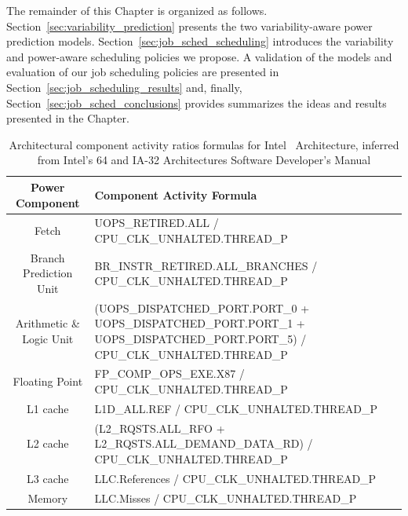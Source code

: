 The remainder of this Chapter is organized as follows.
Section~\ref{sec:variability_prediction} presents the two variability-aware power
prediction models.  Section~\ref{sec:job_sched_scheduling} introduces the variability and
power-aware scheduling policies we propose.  A validation of the models and evaluation of
our job scheduling policies are presented in Section~\ref{sec:job_scheduling_results}
and, finally, Section~\ref{sec:job_sched_conclusions} provides summarizes the
ideas and results presented in the Chapter.


\begin{table}
	\centering
	\caption{Architectural component activity ratios formulas for Intel \ARCH~Architecture,
inferred from Intel's 64 and IA-32 Architectures Software Developer's Manual
\cite{fquesnel:progguide:intel10}}
	\label{tab:comp_formulas}
	\begin{tabular}{ | c | m{10cm} | } 
		\hline
		\textbf{Power Component} & \textbf{Component Activity Formula} \\ 
		\hline
		\hline
		Fetch & UOPS\_RETIRED.ALL / CPU\_CLK\_UNHALTED.THREAD\_P \\ 
		\hline
		Branch Prediction Unit & BR\_INSTR\_RETIRED.ALL\_BRANCHES / CPU\_CLK\_UNHALTED.THREAD\_P \\ 
		\hline
		Arithmetic \& Logic Unit & (UOPS\_DISPATCHED\_PORT.PORT\_0 + UOPS\_DISPATCHED\_PORT.PORT\_1 + UOPS\_DISPATCHED\_PORT.PORT\_5) / CPU\_CLK\_UNHALTED.THREAD\_P \\ 
		\hline
		Floating Point & FP\_COMP\_OPS\_EXE.X87 / \newline CPU\_CLK\_UNHALTED.THREAD\_P \\ 
		\hline
		L1 cache & L1D\_ALL.REF / CPU\_CLK\_UNHALTED.THREAD\_P \\ 
		\hline 
		L2 cache & (L2\_RQSTS.ALL\_RFO + \newline L2\_RQSTS.ALL\_DEMAND\_DATA\_RD) / \newline CPU\_CLK\_UNHALTED.THREAD\_P \\ 
		\hline	
		L3 cache & LLC.References / CPU\_CLK\_UNHALTED.THREAD\_P \\ 
		\hline
		Memory & LLC.Misses / CPU\_CLK\_UNHALTED.THREAD\_P \\ 
		\hline
	\end{tabular}
\end{table}

